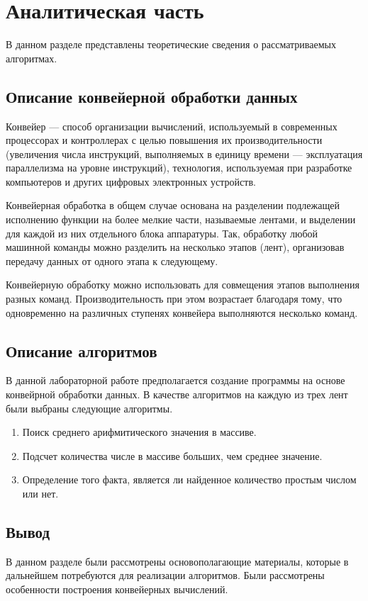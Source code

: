 \chapter{Аналитическая часть}
В данном разделе представлены теоретические сведения о рассматриваемых алгоритмах.

\section{Описание конвейерной обработки данных}
Конвейер \cite{konveer} — способ организации вычислений, используемый в современных процессорах и контроллерах с целью повышения их производительности (увеличения числа инструкций, выполняемых в единицу времени — эксплуатация параллелизма на уровне инструкций), технология, используемая при разработке компьютеров и других цифровых электронных устройств.

Конвейерная обработка в общем случае основана на разделении подлежащей исполнению функции на более мелкие части, называемые лентами, и выделении для каждой из них отдельного блока аппаратуры. Так, обработку любой машинной команды можно разделить на несколько этапов (лент), организовав передачу данных от одного этапа к следующему.

Конвейерную обработку можно использовать для совмещения этапов выполнения разных команд. Производительность при этом возрастает благодаря тому, что одновременно на различных ступенях конвейера выполняются несколько команд.


\section{Описание алгоритмов}
В данной лабораторной работе предполагается создание программы на основе конвейрной обработки данных. В качестве алгоритмов на каждую из трех лент были выбраны следующие алгоритмы.
\begin{enumerate}
	\item Поиск среднего арифмитического значения в массиве.
	\item Подсчет количества числе в массиве больших, чем среднее значение.
	\item Определение того факта, является ли найденное количество простым числом или нет.
\end{enumerate}


\section{Вывод}
В данном разделе были рассмотрены основополагающие материалы, которые в дальнейшем потребуются для реализации алгоритмов. Были рассмотрены особенности построения конвейерных вычислений.

